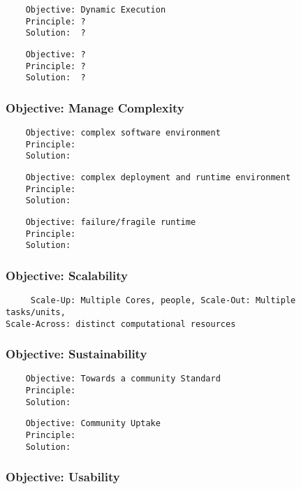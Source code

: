\documentclass[a4paper,10pt]{article}
\begin{document}
  \begin{verbatim}
    Objective: Dynamic Execution
    Principle: ?
    Solution:  ?
   \end{verbatim}

  \begin{verbatim}
    Objective: ?
    Principle: ?
    Solution:  ?
   \end{verbatim}

 \subsubsection{Objective: Manage Complexity}
 
  \begin{verbatim}
    Objective: complex software environment 
    Principle: 
    Solution:  
   \end{verbatim} 

   \begin{verbatim}
    Objective: complex deployment and runtime environment
    Principle: 
    Solution:  
   \end{verbatim}

   \begin{verbatim}
    Objective: failure/fragile runtime 
    Principle: 
    Solution:  
   \end{verbatim}

 \subsubsection{Objective: Scalability}

   \begin{verbatim}
     Scale-Up: Multiple Cores, people, Scale-Out: Multiple tasks/units,
Scale-Across: distinct computational resources
   \end{verbatim}


\subsubsection{Objective: Sustainability}
  \begin{verbatim}
    Objective: Towards a community Standard 
    Principle: 
    Solution:  
   \end{verbatim}

  \begin{verbatim}
    Objective: Community Uptake
    Principle: 
    Solution:  
   \end{verbatim}

\subsubsection{Objective: Usability}
\end{document}
